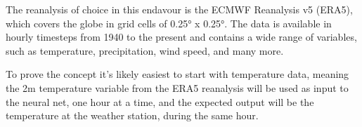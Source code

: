 
The reanalysis of choice in this endavour is the ECMWF Reanalysis v5 (ERA5), which covers the globe in grid cells of 0.25° x 0.25°. The data is available in hourly timesteps from 1940 to the present and contains a wide range of variables, such as temperature, precipitation, wind speed, and many more.


To prove the concept it's likely easiest to start with temperature data, meaning the 2m temperature variable from the ERA5 reanalysis will be used as input to the neural net, one hour at a time, and the expected output will be the temperature at the weather station, during the same hour.